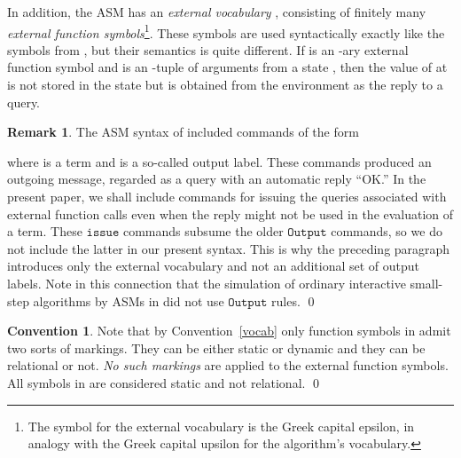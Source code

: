 \documentclass{LMCS}
\theoremstyle{definition}
\newtheorem{rmk}[thm]{Remark}
\newtheorem{conn}[thm]{Convention}
\newcommand{\ttt}[1]{\ensuremath{\mathtt {#1}}}
\begin{document}
In addition, the ASM
has an
\emph{external vocabulary} , consisting of finitely many
\emph{external function symbols}\footnote{The symbol  for the
external vocabulary is the Greek capital epsilon, in analogy with the
Greek capital upsilon  for the algorithm's vocabulary.}.
These symbols are used syntactically exactly like the symbols from
, but their semantics is quite different.  If  is an
-ary external function symbol and  is an -tuple of
arguments from a state , then the value of  at  is not
stored in the state but is obtained from the environment as the reply
to a query.

\begin{rmk}
The ASM syntax of \cite{oa2} included commands of the form

where  is a term and  is a so-called output
label.  These commands produced an outgoing message, regarded as a
query with an automatic reply ``OK.''  In the present paper, we shall
include commands for issuing the queries associated with external
function calls even when the reply might not be used in the evaluation
of a  term.  These \ttt{issue} commands subsume the older \ttt{Output}
commands, so we do not include the latter in our present syntax.  This
is why the preceding paragraph introduces only the external vocabulary
and not an additional set of output labels.  Note in this connection
that the simulation of ordinary interactive small-step algorithms by
ASMs in \cite{oa3} did not use \ttt{Output} rules.
\qed\end{rmk}

\begin{conn}
  Note that by Convention~\ref{vocab} only function symbols in
   admit two sorts of markings.   They can be either static
  or dynamic and they can be relational or not.  \emph{No such
  markings} are applied to the external function symbols.  All symbols
  in  are considered static and not relational.
\qed\end{conn}
\end{document}
